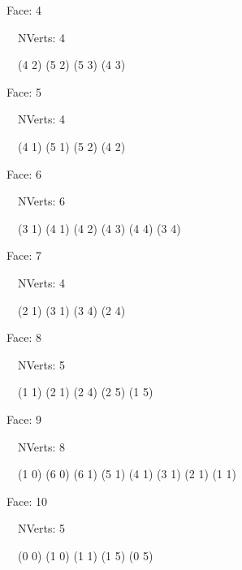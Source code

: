 \documentclass{article}
\begin{document}
    {\footnotesize

    Face: 4

    \   \    NVerts: 4

     \   \   (4 2) (5 2) (5 3) (4 3)}

    {\footnotesize

    Face: 5

    \   \    NVerts: 4

     \   \   (4 1) (5 1) (5 2) (4 2)}

    {\footnotesize

    Face: 6

    \   \    NVerts: 6

     \   \   (3 1) (4 1) (4 2) (4 3) (4 4) (3 4)}

    {\footnotesize

    Face: 7

    \   \    NVerts: 4

     \   \   (2 1) (3 1) (3 4) (2 4)}

    {\footnotesize

    Face: 8

    \   \    NVerts: 5

     \   \   (1 1) (2 1) (2 4) (2 5) (1 5)}

    {\footnotesize

    Face: 9

    \   \    NVerts: 8

     \   \   (1 0) (6 0) (6 1) (5 1) (4 1) (3 1) (2 1) (1 1)}

    {\footnotesize

    Face: 10

    \   \    NVerts: 5

     \   \   (0 0) (1 0) (1 1) (1 5) (0 5)}


     \newpage
\end{document}
